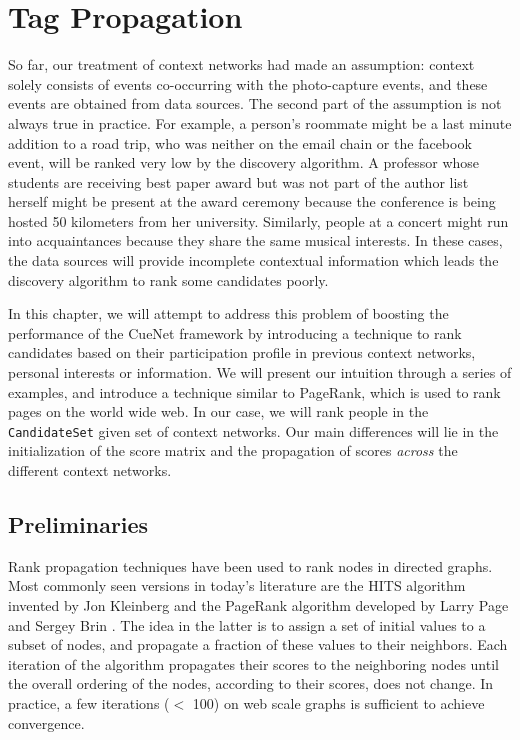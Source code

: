 \chapter{Tag Propagation}

So far, our treatment of context networks had made an assumption: context solely consists of events co-occurring with the photo-capture events, and these events are obtained from data sources. The second part of the assumption is not always true in practice. For example, a person's roommate might be a last minute addition to a road trip, who was neither on the email chain or the facebook event, will be ranked very low by the discovery algorithm. A professor whose students are receiving best paper award but was not part of the author list herself might be present at the award ceremony because the conference is being hosted 50 kilometers from her university. Similarly, people at a concert might run into acquaintances because they share the same musical interests. In these cases, the data sources will provide incomplete contextual information which leads the discovery algorithm to rank some candidates poorly.

In this chapter, we will attempt to address this problem of boosting the performance of the CueNet framework by introducing a technique to rank candidates based on their participation profile in previous context networks, personal interests or information. We will present our intuition through a series of examples, and introduce a technique similar to PageRank, which is used to rank pages on the world wide web. In our case, we will rank people in the \texttt{CandidateSet} given set of context networks. Our main differences will lie in the initialization of the score matrix and the propagation of scores \textit{across} the different context networks.

\section{Preliminaries}

Rank propagation techniques have been used to rank nodes in directed graphs. Most commonly seen versions in today's literature are the HITS algorithm invented by Jon Kleinberg \cite{kleinberg1999authoritative} and the PageRank algorithm developed by Larry Page and Sergey Brin \cite{page1999pagerank}. The idea in the latter is to assign a set of initial values to a subset of nodes, and propagate a fraction of these values to their neighbors. Each iteration of the algorithm propagates their scores to the neighboring nodes until the overall ordering of the nodes, according to their scores, does not change. In practice, a few iterations ($<$ 100) on web scale graphs is sufficient to achieve convergence.

